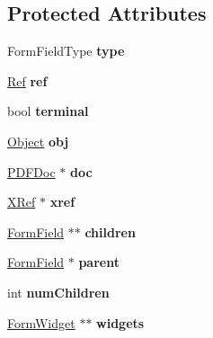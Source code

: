 \subsection*{Protected Attributes}
\begin{DoxyCompactItemize}
\item 
\mbox{\label{class_form_field_af7460ae938cd3d6855c859a1132d1598}} 
Form\+Field\+Type {\bfseries type}
\item 
\mbox{\label{class_form_field_ab70f84c1a0522805b6cdf1a34bc6cc50}} 
\hyperlink{struct_ref}{Ref} {\bfseries ref}
\item 
\mbox{\label{class_form_field_a9609f9912a39b64ea3d5e848e334c014}} 
bool {\bfseries terminal}
\item 
\mbox{\label{class_form_field_a9c3fe514bc0bd89630582c4e4acdaa57}} 
\hyperlink{class_object}{Object} {\bfseries obj}
\item 
\mbox{\label{class_form_field_ad0c6f49dd4e292f527113b5c208c6507}} 
\hyperlink{class_p_d_f_doc}{P\+D\+F\+Doc} $\ast$ {\bfseries doc}
\item 
\mbox{\label{class_form_field_a658a990ff70d7fe63b01ace6ee68c053}} 
\hyperlink{class_x_ref}{X\+Ref} $\ast$ {\bfseries xref}
\item 
\mbox{\label{class_form_field_a2da7f3f6d83c8a12f39bea7cb747634a}} 
\hyperlink{class_form_field}{Form\+Field} $\ast$$\ast$ {\bfseries children}
\item 
\mbox{\label{class_form_field_a72b881d0470ca15bbbd35551d29d552a}} 
\hyperlink{class_form_field}{Form\+Field} $\ast$ {\bfseries parent}
\item 
\mbox{\label{class_form_field_aa84c4f4be53b3cec8fdba8f619db2660}} 
int {\bfseries num\+Children}
\item 
\mbox{\label{class_form_field_a503d0752824d6be98f74fd5b0306efe6}} 
\hyperlink{class_form_widget}{Form\+Widget} $\ast$$\ast$ {\bfseries widgets}
\item 

\end{DoxyCompactItemize}
